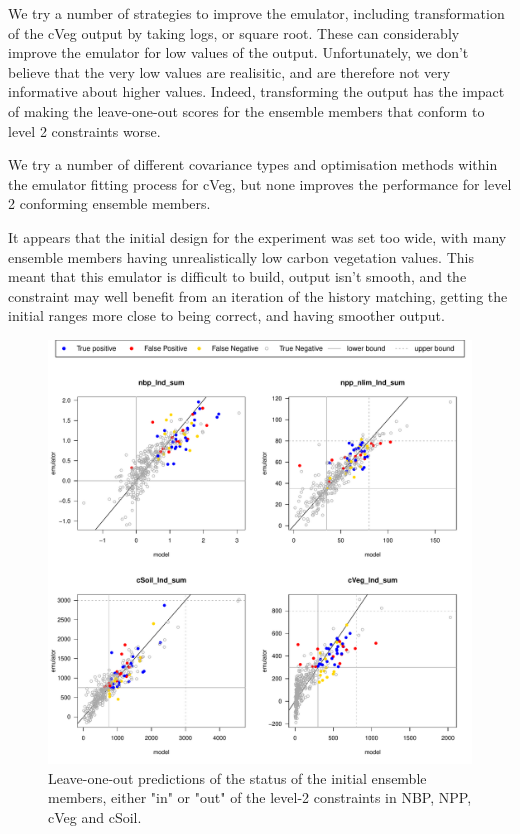 \documentclass[gmd, manuscript]{copernicus}
\begin{document}
We try a number of strategies to improve the emulator, including transformation of the cVeg output by taking logs, or square root. These can considerably improve the emulator for low values of the output. Unfortunately, we don't believe that the very low values are realisitic, and are therefore not very informative about higher values. Indeed, transforming the output has the impact of making the leave-one-out scores for the ensemble members that conform to level 2 constraints worse.

We try a number of different covariance types and optimisation methods within the emulator fitting process for cVeg, but none improves the performance for level 2 conforming ensemble members.

It appears that the initial design for the experiment was set too wide, with many ensemble members having unrealistically low carbon vegetation values. This meant that this emulator is difficult to build, output isn't smooth, and the constraint may well benefit from an iteration of the history matching, getting the initial ranges more close to being correct, and having smoother output.



\begin{figure}[ht]
\includegraphics[width=12cm]{./figs/figA06.pdf}
\caption{Leave-one-out predictions of the status of the initial ensemble members, either "in" or "out" of the level-2 constraints in NBP, NPP, cVeg and cSoil.}
\label{fig:Y_const_loo}
\end{figure}
\end{document}
